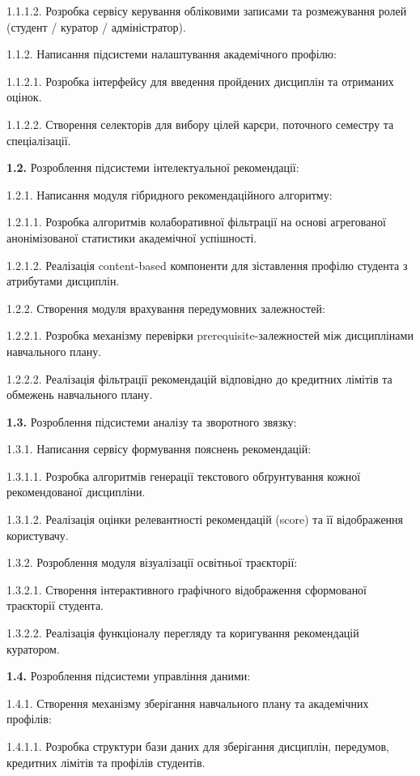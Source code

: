 \documentclass[
]{article}
\begin{document}
1.1.1.2. Розробка сервісу керування обліковими записами та розмежування
ролей (студент / куратор / адміністратор).

1.1.2. Написання підсистеми налаштування академічного профілю:

1.1.2.1. Розробка інтерфейсу для введення пройдених дисциплін та
отриманих оцінок.

1.1.2.2. Створення селекторів для вибору цілей кар\textquotesingle єри,
поточного семестру та спеціалізації.

\textbf{1.2.} Розроблення підсистеми інтелектуальної рекомендації:

1.2.1. Написання модуля гібридного рекомендаційного алгоритму:

1.2.1.1. Розробка алгоритмів колаборативної фільтрації на основі
агрегованої анонімізованої статистики академічної успішності.

1.2.1.2. Реалізація content-based компоненти для зіставлення профілю
студента з атрибутами дисциплін.

1.2.2. Створення модуля врахування передумовних залежностей:

1.2.2.1. Розробка механізму перевірки prerequisite-залежностей між
дисциплінами навчального плану.

1.2.2.2. Реалізація фільтрації рекомендацій відповідно до кредитних
лімітів та обмежень навчального плану.

\textbf{1.3.} Розроблення підсистеми аналізу та зворотного
зв\textquotesingle язку:

1.3.1. Написання сервісу формування пояснень рекомендацій:

1.3.1.1. Розробка алгоритмів генерації текстового обґрунтування кожної
рекомендованої дисципліни.

1.3.1.2. Реалізація оцінки релевантності рекомендацій (score) та її
відображення користувачу.

1.3.2. Розроблення модуля візуалізації освітньої траєкторії:

1.3.2.1. Створення інтерактивного графічного відображення сформованої
траєкторії студента.

1.3.2.2. Реалізація функціоналу перегляду та коригування рекомендацій
куратором.

\textbf{1.4.} Розроблення підсистеми управління даними:

1.4.1. Створення механізму зберігання навчального плану та академічних
профілів:

1.4.1.1. Розробка структури бази даних для зберігання дисциплін,
передумов, кредитних лімітів та профілів студентів.
\end{document}
